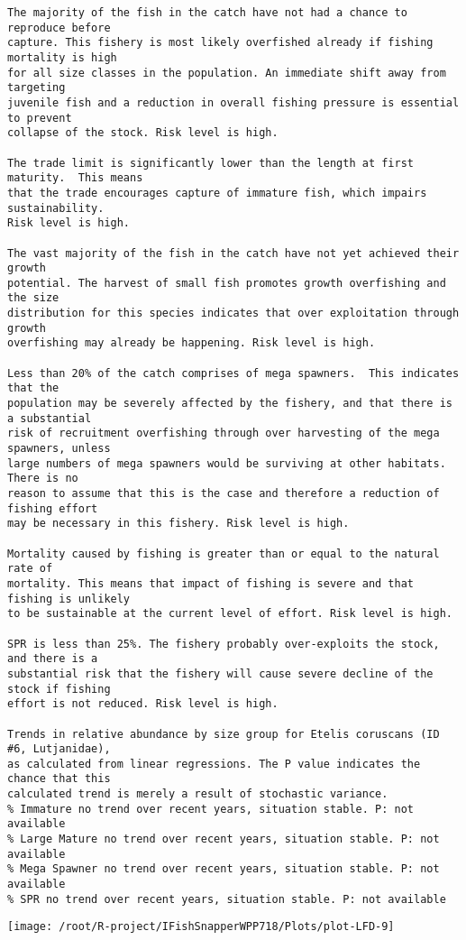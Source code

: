 \documentclass{report}\usepackage[]{graphicx}\usepackage[]{color}
\makeatletter
\def\maxwidth{ %
  \ifdim\Gin@nat@width>\linewidth
    \linewidth
  \else
    \Gin@nat@width
  \fi
}
\newenvironment{kframe}{%
 \def\at@end@of@kframe{}%
 \ifinner\ifhmode%
  \def\at@end@of@kframe{\end{minipage}}%
  \begin{minipage}{\columnwidth}%
 \fi\fi%
 \def\FrameCommand##1{\hskip\@totalleftmargin \hskip-\fboxsep
 \colorbox{shadecolor}{##1}\hskip-\fboxsep
     \hskip-\linewidth \hskip-\@totalleftmargin \hskip\columnwidth}%
 \MakeFramed {\advance\hsize-\width
   \@totalleftmargin\z@ \linewidth\hsize
   \@setminipage}}%
 {\par\unskip\endMakeFramed%
 \at@end@of@kframe}
\newenvironment{knitrout}{}{} %
\makeatother
\begin{document}
\begin{knitrout}
\begin{kframe}
\begin{verbatim}
The majority of the fish in the catch have not had a chance to reproduce before
capture. This fishery is most likely overfished already if fishing mortality is high
for all size classes in the population. An immediate shift away from targeting
juvenile fish and a reduction in overall fishing pressure is essential to prevent
collapse of the stock. Risk level is high.

The trade limit is significantly lower than the length at first maturity.  This means
that the trade encourages capture of immature fish, which impairs sustainability.
Risk level is high.

The vast majority of the fish in the catch have not yet achieved their growth
potential. The harvest of small fish promotes growth overfishing and the size
distribution for this species indicates that over exploitation through growth
overfishing may already be happening. Risk level is high.

Less than 20% of the catch comprises of mega spawners.  This indicates that the
population may be severely affected by the fishery, and that there is a substantial
risk of recruitment overfishing through over harvesting of the mega spawners, unless
large numbers of mega spawners would be surviving at other habitats. There is no
reason to assume that this is the case and therefore a reduction of fishing effort
may be necessary in this fishery. Risk level is high.
 
Mortality caused by fishing is greater than or equal to the natural rate of
mortality. This means that impact of fishing is severe and that fishing is unlikely
to be sustainable at the current level of effort. Risk level is high.
 
SPR is less than 25%. The fishery probably over-exploits the stock, and there is a
substantial risk that the fishery will cause severe decline of the stock if fishing
effort is not reduced. Risk level is high.
 
Trends in relative abundance by size group for Etelis coruscans (ID #6, Lutjanidae),
as calculated from linear regressions. The P value indicates the chance that this
calculated trend is merely a result of stochastic variance.
% Immature no trend over recent years, situation stable. P: not available
% Large Mature no trend over recent years, situation stable. P: not available
% Mega Spawner no trend over recent years, situation stable. P: not available
% SPR no trend over recent years, situation stable. P: not available
\end{verbatim}
\end{kframe}
\texttt{[image: /root/R-project/IFishSnapperWPP718/Plots/plot-LFD-9]} 


\end{knitrout}
\end{document}
